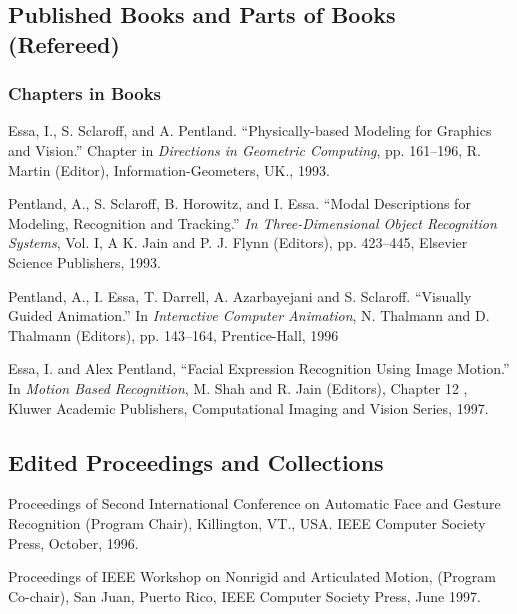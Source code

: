 \subsection{Published Books and Parts of Books (Refereed)}
\label{subsec:books}

\subsubsection{Chapters in Books}
\label{subsubsec:chapters}

\begin{pub}
\item Essa, I., S. Sclaroff, and A. Pentland. ``Physically-based Modeling for
Graphics and Vision.'' Chapter in \textit{Directions in Geometric
Computing}, pp. 161--196, R. Martin (Editor),
Information-Geometers, UK., 1993.

\item Pentland, A., S. Sclaroff, B. Horowitz, and I. Essa. ``Modal Descriptions
for Modeling, Recognition and Tracking.'' \textit{In
Three-Dimensional Object Recognition Systems}, Vol. I, A K. Jain
and P. J. Flynn (Editors), pp. 423--445, Elsevier Science
Publishers, 1993.

\item Pentland, A., I. Essa, T. Darrell, A. Azarbayejani and S. Sclaroff.
``Visually Guided Animation.'' In \textit{Interactive Computer
Animation}, N. Thalmann and D. Thalmann (Editors), pp. 143--164,
Prentice-Hall, 1996

\item Essa, I. and Alex Pentland, ``Facial Expression Recognition Using Image Motion.'' In \textit{Motion Based
Recognition}, M. Shah and R. Jain (Editors), Chapter 12 , Kluwer
Academic Publishers, Computational Imaging and Vision Series,
1997. \label{pub:mbr97}

\end{pub}

\subsection{Edited Proceedings and Collections}
\label{subsec:edited}

\begin{pub}

\item Proceedings of Second International Conference on Automatic Face and Gesture
Recognition (Program Chair), Killington, VT., USA. IEEE Computer Society
Press, October, 1996.

\item Proceedings of IEEE Workshop on Nonrigid and Articulated Motion, (Program
Co-chair), San Juan, Puerto Rico, IEEE Computer Society Press, June 1997.


\end{pub}


